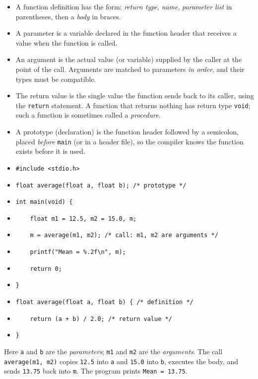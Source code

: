 \documentclass[11pt]{article}
\newcommand{\cle}[1]{{\popxbold\color{popdark}#1}}
\begin{document}
\begin{definition}
\begin{itemize}
\item A \cle{function definition} has the form: \emph{return type}, \emph{name}, \emph{parameter list} in parentheses, then a \emph{body} in braces.
\item A \cle{parameter} is a variable declared in the function header that receives a value when the function is called.
\item An \cle{argument} is the actual value (or variable) supplied by the caller at the point of the call. Arguments are matched to parameters \emph{in order}, and their types must be compatible.
\item The \cle{return value} is the single value the function sends back to its caller, using the \texttt{return} statement. A function that returns nothing has return type \texttt{void}; such a function is sometimes called a \emph{procedure}.
\item A \cle{prototype} (declaration) is the function header followed by a semicolon, placed \emph{before} \texttt{main} (or in a header file), so the compiler knows the function exists before it is used.
\end{itemize}
\end{definition}

\begin{exemplebox}
\begin{itemize}
\item[] \texttt{\#include <stdio.h>}
\item[] \texttt{float average(float a, float b);   /* prototype */}
\item[] \texttt{int main(void) \{}
\item[] \texttt{\ \ \ \ float m1 = 12.5, m2 = 15.0, m;}
\item[] \texttt{\ \ \ \ m = average(m1, m2);        /* call: m1, m2 are arguments */}
\item[] \texttt{\ \ \ \ printf("Mean = \%.2f\textbackslash n", m);}
\item[] \texttt{\ \ \ \ return 0;}
\item[] \texttt{\}}
\item[] \texttt{float average(float a, float b) \{  /* definition */}
\item[] \texttt{\ \ \ \ return (a + b) / 2.0;       /* return value */}
\item[] \texttt{\}}
\end{itemize}
Here \texttt{a} and \texttt{b} are the \emph{parameters}; \texttt{m1} and \texttt{m2} are the \emph{arguments}. The call \texttt{average(m1, m2)} copies \texttt{12.5} into \texttt{a} and \texttt{15.0} into \texttt{b}, executes the body, and sends \texttt{13.75} back into \texttt{m}. The program prints \texttt{Mean = 13.75}.
\end{exemplebox}
\end{document}
